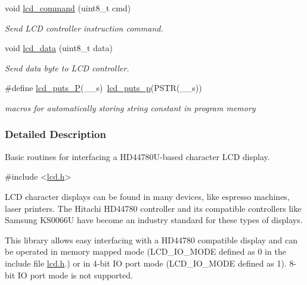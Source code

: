 \begin{DoxyCompactItemize}
void \hyperlink{a00010_gaea9d14f02df06f948cb5a56776980826}{lcd\+\_\+command} (uint8\+\_\+t cmd)
\begin{DoxyCompactList}\small\item\em Send L\+CD controller instruction command. \end{DoxyCompactList}\item 
void \hyperlink{a00010_gad0729d2cba627825a089ca1fff12ba29}{lcd\+\_\+data} (uint8\+\_\+t data)
\begin{DoxyCompactList}\small\item\em Send data byte to L\+CD controller. \end{DoxyCompactList}\item 
\#define \hyperlink{a00010_ga4f1928f1515e21422d5a33af2949f2f7}{lcd\+\_\+puts\+\_\+P}(\+\_\+\+\_\+s)~\hyperlink{a00010_ga9022a24a56a9b15681f62eb6ba77e5de}{lcd\+\_\+puts\+\_\+p}(P\+S\+TR(\+\_\+\+\_\+s))\hypertarget{a00010_ga4f1928f1515e21422d5a33af2949f2f7}{}\label{a00010_ga4f1928f1515e21422d5a33af2949f2f7}

\begin{DoxyCompactList}\small\item\em macros for automatically storing string constant in program memory \end{DoxyCompactList}\end{DoxyCompactItemize}


\subsubsection{Detailed Description}
Basic routines for interfacing a H\+D44780\+U-\/based character L\+CD display. 


\begin{DoxyCode}
\textcolor{preprocessor}{#include <\hyperlink{a00003}{lcd.h}>} 
\end{DoxyCode}


L\+CD character displays can be found in many devices, like espresso machines, laser printers. The Hitachi H\+D44780 controller and its compatible controllers like Samsung K\+S0066U have become an industry standard for these types of displays.

This library allows easy interfacing with a H\+D44780 compatible display and can be operated in memory mapped mode (L\+C\+D\+\_\+\+I\+O\+\_\+\+M\+O\+DE defined as 0 in the include file \hyperlink{a00003}{lcd.\+h}.) or in 4-\/bit IO port mode (L\+C\+D\+\_\+\+I\+O\+\_\+\+M\+O\+DE defined as 1). 8-\/bit IO port mode is not supported.

